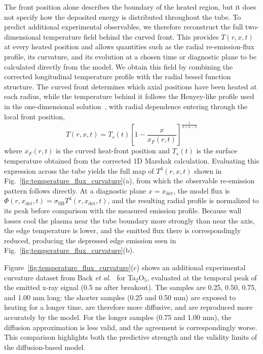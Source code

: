 \documentclass[prl, twocolumn, superscriptaddress, amsmath, amssymb, reprint]{revtex4-2}
\begin{document}
The front position alone describes the boundary of the heated region, but it does not specify how the deposited energy is distributed throughout the tube. To predict additional experimental observables, we therefore reconstruct the full two-dimensional temperature field behind the curved front. This provides $T(r,x,t)$ at every heated position and allows quantities such as the radial re-emission-flux profile, its curvature, and its evolution at a chosen time or diagnostic plane to be calculated directly from the model. We obtain this field by combining the corrected longitudinal temperature profile with the radial bessel function structure. The curved front determines which axial positions have been heated at each radius, while the temperature behind it follows the Henyey-like profile used in the one-dimensional solution~\cite{Hammer2003,Rosen2009}, with radial dependence entering through the local front position,
\begin{equation}\label{eq:henyey_profile}
T(r,x,t) = T_s(t)\left[1-\dfrac{x}{x_F(r,t)}\right]^{\frac{1}{4+\alpha-\beta}}
\end{equation}
where $x_F(r,t)$ is the curved heat-front position and $T_s(t)$ is the surface temperature obtained from the corrected 1D Marshak calculation. Evaluating this expression across the tube yields the full map of $T^4(r,x,t)$ shown in Fig.~\ref{fig:temperature_flux_curvature}(a), from which the observable re-emission pattern follows directly. At a diagnostic plane $x=x_{\mathrm{det}}$, the model flux is $\Phi(r,x_{\mathrm{det}},t)=\sigma_{\mathrm{SB}}T^4(r,x_{\mathrm{det}},t)$, and the resulting radial profile is normalized to its peak before comparison with the measured emission profile. Because wall losses cool the plasma near the tube boundary more strongly than near the axis, the edge temperature is lower, and the emitted flux there is correspondingly reduced, producing the depressed edge emission seen in Fig.~\ref{fig:temperature_flux_curvature}(b).

Figure~\ref{fig:temperature_flux_curvature}(c) shows an additional experimental curvature dataset from Back \textit{et al.}~\cite{Back2000POP} for Ta$_2$O$_5$, evaluated at the temporal peak of the emitted x-ray signal (0.5 ns after breakout). The samples are 0.25, 0.50, 0.75, and 1.00 mm long: the shorter samples (0.25 and 0.50 mm) are exposed to heating for a longer time, are therefore more diffusive, and are reproduced more accurately by the model. For the longer samples (0.75 and 1.00 mm), the diffusion approximation is less valid, and the agreement is correspondingly worse. This comparison highlights both the predictive strength and the validity limits of the diffusion-based model.
\end{document}

